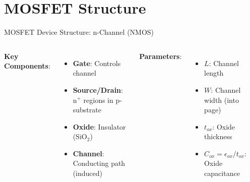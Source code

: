 \documentclass[10pt, aspectratio=169]{beamer}
\begin{document}
\section{MOSFET Structure}

\begin{frame}{MOSFET Device Structure: n-Channel (NMOS)}
    
    \begin{columns}[t]
        \textbf{Key Components}:
        \begin{itemize}
            \item \textbf{Gate}: Controls channel
            \item \textbf{Source/Drain}: n$^+$ regions in p-substrate
            \item \textbf{Oxide}: Insulator (SiO$_2$)
            \item \textbf{Channel}: Conducting path (induced)
        \end{itemize}
        
        
        \textbf{Parameters}:
        \begin{itemize}
            \item $L$: Channel length
            \item $W$: Channel width (into page)
            \item $t_{ox}$: Oxide thickness
            \item $C_{ox} = \epsilon_{ox}/t_{ox}$: Oxide capacitance
        \end{itemize}
        
        \begin{center}
\end{center}
\end{columns}
\end{frame}
\end{document}
